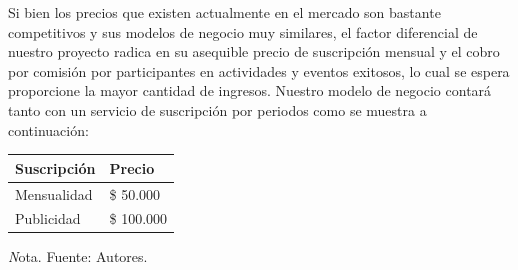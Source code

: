 {\begin{adjustbox}
{\begin{threeparttable}
        \end{threeparttable} 
    }        
            
\end{adjustbox}

Si bien los precios que existen actualmente en el mercado son bastante competitivos y sus modelos de negocio muy similares, el factor diferencial de nuestro proyecto radica en su asequible precio de suscripción mensual y el cobro por comisión por participantes en actividades y eventos exitosos, lo cual se espera proporcione la mayor cantidad de ingresos. Nuestro modelo de negocio contará tanto con un servicio de suscripción por periodos como se muestra a continuación:

\begin{adjustbox}{
            center,
            caption=[{Precios de suscripción.}]{Precios de suscripción mensual y publicidad. },
            label={PrecioPeriodos},
            nofloat=table, vspace={20px}}
            {
            \begin{threeparttable}
           \begin{tabular}{|p{7.8cm}|p{7.8cm}|}
            \hline
            \rowcolor[HTML]{D9EAD3} 
            Suscripción & Precio       \\ \hline
            Mensualidad & \$ 50.000    \\ \hline
            Publicidad   & \$ 100.000   \\ \hline
            \end{tabular}%
            
            \begin{tablenotes}
                \vspace{2mm}
                \textit Nota. Fuente: Autores.
            \end{tablenotes}
            
        \end{threeparttable} 
    }        
            
\end{adjustbox}
}